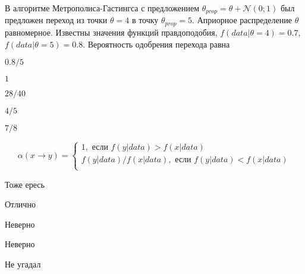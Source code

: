 
\begin{question}
В алгоритме Метрополиса-Гастингса с предложением $\theta_{prop} = \theta + \mathcal N(0;1)$ 
 был предложен переход из точки
\(\theta=4\) в точку \(\theta_{prop}=5\). Априорное
распределение \(\theta\) равномерное. Известны значения функций
правдоподобия, \(f(data|\theta=4)=0.7\), \(f(data|\theta=5)=0.8\).
Вероятность одобрения перехода равна
\begin{answerlist}
  \item \(0.8/5\)
  \item \(1\)
  \item \(28/40\)
  \item \(4/5\)
  \item \(7/8\)
\end{answerlist}
\end{question}

\begin{solution}
\[
\alpha(x \to y) = \begin{cases}
1, \text{ если } f(y|data) > f(x|data) \\
f(y|data) / f(x|data), \text{ если } f(y|data) < f(x|data) \\
\end{cases}
\]
\begin{answerlist}
  \item Тоже ересь
  \item Отлично
  \item Неверно
  \item Неверно
  \item Не угадал
\end{answerlist}
\end{solution}

